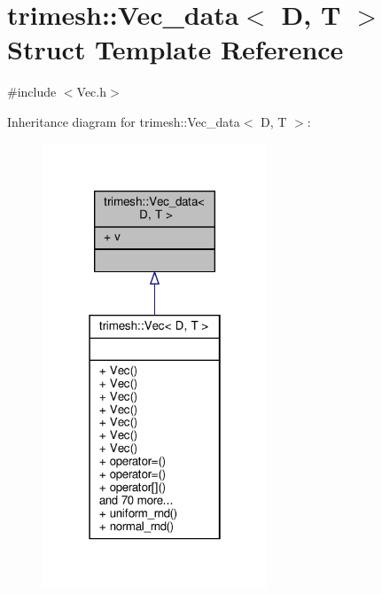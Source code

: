 \hypertarget{structtrimesh_1_1Vec__data}{}\section{trimesh\+:\+:Vec\+\_\+data$<$ D, T $>$ Struct Template Reference}
\label{structtrimesh_1_1Vec__data}


{\ttfamily \#include $<$Vec.\+h$>$}



Inheritance diagram for trimesh\+:\+:Vec\+\_\+data$<$ D, T $>$\+:\nopagebreak
\begin{figure}[H]
\begin{center}
\leavevmode
\includegraphics[width=190pt]{d6/dcb/structtrimesh_1_1Vec__data__inherit__graph}
\end{center}
\end{figure}


